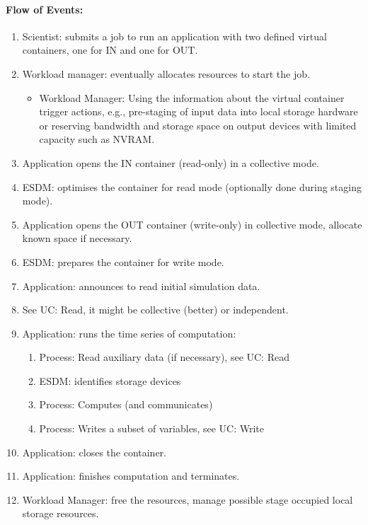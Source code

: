 

\paragraph{Flow of Events:}
\begin{enumerate}
	\item Scientist: submits a job to run an application with two defined virtual containers, one for IN and one for OUT.
	\item Workload manager: eventually allocates resources to start the job.
	  \begin{itemize}
	  \item Workload Manager: Using the information about the virtual container trigger actions, e.g., pre-staging of input data into local storage hardware or reserving bandwidth and storage space on output devices with limited capacity such as NVRAM.
	  \end{itemize}
	\item Application opens the IN container (read-only) in a collective mode.
	\item ESDM: optimises the container for read mode (optionally done during staging mode).
	\item Application opens the OUT container (write-only) in collective mode, allocate known space if necessary.
	\item ESDM: prepares the container for write mode.
	\item Application: announces to read initial simulation data.
	\item See UC: Read, it might be collective (better) or independent.
	\item Application: runs the time series of computation:
	\begin{enumerate}
		\item Process: Read auxiliary data (if necessary), see UC: Read
		\item ESDM: identifies storage devices
		\item Process: Computes (and communicates)
		\item Process: Writes a subset of variables, see UC: Write
	\end{enumerate}
	\item Application: closes the container.
	\item Application: finishes computation and terminates.
	\item Workload Manager: free the resources, manage possible stage occupied local storage resources.
\end{enumerate}


